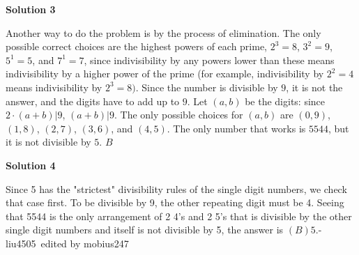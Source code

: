 \begin{enumerate}
 



\textbf{Solution 3}

Another way to do the problem is by the process of elimination. The only possible correct choices are the highest powers of each prime, $2^3=8$, $3^2=9$, $5^1=5$, and $7^1=7$, since indivisibility by any powers lower than these means indivisibility by a higher power of the prime (for example, indivisibility by $2^2=4$ means indivisibility by $2^3=8)$. Since the number is divisible by $9$, it is not the answer, and the digits have to add up to $9$. Let $(a,b)$ be the digits: since $2\cdot(a+b) | 9$, $(a+b)|9$. The only possible choices for $(a,b)$ are $(0,9)$, $(1,8)$, $(2,7)$, $(3,6)$, and $(4,5)$. The only number that works is $5544$, but it is not divisible by $5$. $\boxed{ B }$




\textbf{Solution 4}

Since 5 has the "strictest" divisibility rules of the single digit numbers, we check that case first. To be divisible by 9, the other repeating digit must be 4. Seeing that 5544 is the only arrangement of 2 4's and 2 5's that is divisible by the other single digit numbers and itself is not divisible by 5, the answer is $\boxed {(B) 5}$.-liu4505~edited by mobius247

 


\end{enumerate}